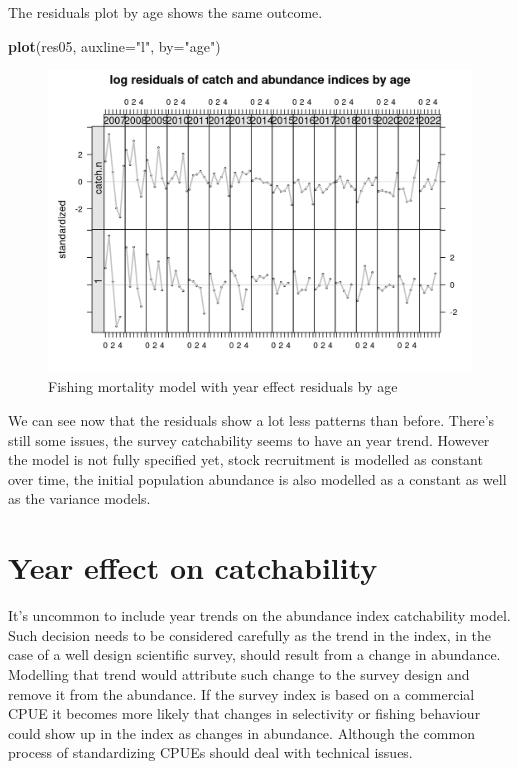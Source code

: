 \documentclass[
]{book}
\newenvironment{Shaded}{\begin{snugshade}}{\end{snugshade}}
\newcommand{\AttributeTok}[1]{\textcolor[rgb]{0.13,0.29,0.53}{#1}}
\newcommand{\FunctionTok}[1]{\textcolor[rgb]{0.13,0.29,0.53}{\textbf{#1}}}
\newcommand{\NormalTok}[1]{#1}
\newcommand{\StringTok}[1]{\textcolor[rgb]{0.31,0.60,0.02}{#1}}
\begin{document}
The residuals plot by age shows the same outcome.

\begin{Shaded}
\begin{Highlighting}[]
\FunctionTok{plot}\NormalTok{(res05, }\AttributeTok{auxline=}\StringTok{"l"}\NormalTok{, }\AttributeTok{by=}\StringTok{"age"}\NormalTok{)}
\end{Highlighting}
\end{Shaded}

\begin{figure}
\centering
\includegraphics{_bookdown_files/_main_files/figure-html/fyearresbyage-1.png}
\caption{\label{fig:fyearresbyage}Fishing mortality model with year effect residuals by age}
\end{figure}

We can see now that the residuals show a lot less patterns than before. There's still some issues, the survey catchability seems to have an year trend. However the model is not fully specified yet, stock recruitment is modelled as constant over time, the initial population abundance is also modelled as a constant as well as the variance models.

\hypertarget{year-effect-on-catchability}{%
\section{Year effect on catchability}\label{year-effect-on-catchability}}

It's uncommon to include year trends on the abundance index catchability model. Such decision needs to be considered carefully as the trend in the index, in the case of a well design scientific survey, should result from a change in abundance. Modelling that trend would attribute such change to the survey design and remove it from the abundance. If the survey index is based on a commercial CPUE it becomes more likely that changes in selectivity or fishing behaviour could show up in the index as changes in abundance. Although the common process of standardizing CPUEs should deal with technical issues.
\end{document}

